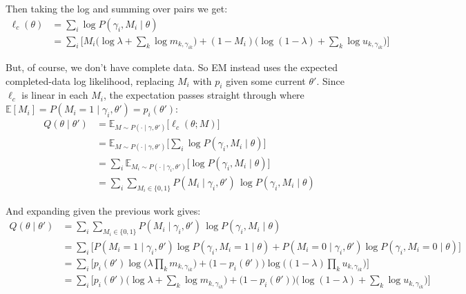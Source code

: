 \documentclass[11pt]{article}
\begin{document}
Then taking the log and summing over pairs we get:
\[
\begin{aligned}
\ell_c(\theta) &= \sum_{i} \log P(\gamma_i, M_i \mid \theta) \\
&= \sum_{i} \Big[ M_i \Big( \log \lambda + \sum_{k} \log m_{k,\gamma_{ik}} \Big) + (1 - M_i) \Big( \log(1-\lambda) + \sum_{k} \log u_{k,\gamma_{ik}} \Big) \Big]
\end{aligned}
\]

But, of course, we don't have complete data. So EM instead uses the expected completed-data log likelihood, replacing $M_i$ with $p_i$ given some current $\theta'$. Since $\ell_c$ is linear in each $M_i$, the expectation passes straight through where $\mathbb{E}[M_i] = P(M_i = 1 \mid \gamma_i, \theta') = p_i(\theta')$:
\[
\begin{aligned}
Q(\theta \mid \theta')
&= \mathbb{E}_{M \sim P(\cdot \mid \gamma, \theta')}\big[\ell_c(\theta; M)\big] \\
&= \mathbb{E}_{M \sim P(\cdot \mid \gamma, \theta')}\Big[\sum_{i} \log P(\gamma_i, M_i \mid \theta)\Big] \\
&= \sum_{i} \mathbb{E}_{M_i \sim P(\cdot \mid \gamma_i, \theta')}\big[\log P(\gamma_i, M_i \mid \theta)\big] \\
&= \sum_{i} \sum_{M_i \in \{0,1\}} P(M_i \mid \gamma_i, \theta')\, \log P(\gamma_i, M_i \mid \theta)
\end{aligned}
\]

And expanding given the previous work gives:
\[
\begin{aligned}
Q(\theta \mid \theta')
&= \sum_{i} \sum_{M_i \in \{0,1\}} P(M_i \mid \gamma_i, \theta')\, \log P(\gamma_i, M_i \mid \theta) \\
&= \sum_{i} \Big[ P(M_i = 1 \mid \gamma_i, \theta') \log P(\gamma_i, M_i = 1 \mid \theta)
   + P(M_i = 0 \mid \gamma_i, \theta') \log P(\gamma_i, M_i = 0 \mid \theta) \Big] \\
&= \sum_{i} \Big[ p_i(\theta') \log \Big( \lambda \prod_{k} m_{k,\gamma_{ik}} \Big)
   + \big(1 - p_i(\theta')\big) \log \Big( (1-\lambda) \prod_{k} u_{k,\gamma_{ik}} \Big) \Big] \\
&= \sum_{i} \Big[ p_i(\theta') \Big( \log \lambda + \sum_{k} \log m_{k,\gamma_{ik}} \Big)
   + \big(1 - p_i(\theta')\big) \Big( \log(1-\lambda) + \sum_{k} \log u_{k,\gamma_{ik}} \Big) \Big]
\end{aligned}
\]
\end{document}
